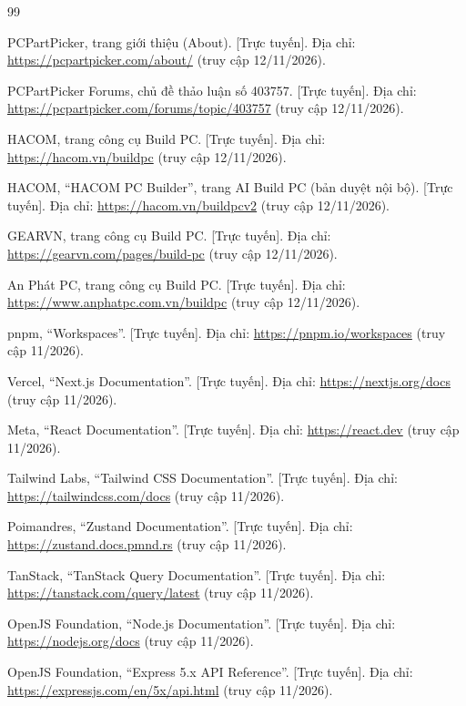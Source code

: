 \begin{thebibliography}{99}
\small

 PCPartPicker, trang giới thiệu (About). [Trực tuyến]. Địa chỉ: \url{https://pcpartpicker.com/about/} (truy cập 12/11/2026).

 PCPartPicker Forums, chủ đề thảo luận số 403757. [Trực tuyến]. Địa chỉ: \url{https://pcpartpicker.com/forums/topic/403757} (truy cập 12/11/2026).

 HACOM, trang công cụ Build PC. [Trực tuyến]. Địa chỉ: \url{https://hacom.vn/buildpc} (truy cập 12/11/2026).

 HACOM, ``HACOM PC Builder'', trang AI Build PC (bản duyệt nội bộ). [Trực tuyến]. Địa chỉ: \url{https://hacom.vn/buildpcv2} (truy cập 12/11/2026).

 GEARVN, trang công cụ Build PC. [Trực tuyến]. Địa chỉ: \url{https://gearvn.com/pages/build-pc} (truy cập 12/11/2026).

 An Phát PC, trang công cụ Build PC. [Trực tuyến]. Địa chỉ: \url{https://www.anphatpc.com.vn/buildpc} (truy cập 12/11/2026).

 pnpm, ``Workspaces''. [Trực tuyến]. Địa chỉ: \url{https://pnpm.io/workspaces} (truy cập 11/2026).

 Vercel, ``Next.js Documentation''. [Trực tuyến]. Địa chỉ: \url{https://nextjs.org/docs} (truy cập 11/2026).

 Meta, ``React Documentation''. [Trực tuyến]. Địa chỉ: \url{https://react.dev} (truy cập 11/2026).

 Tailwind Labs, ``Tailwind CSS Documentation''. [Trực tuyến]. Địa chỉ: \url{https://tailwindcss.com/docs} (truy cập 11/2026).

 Poimandres, ``Zustand Documentation''. [Trực tuyến]. Địa chỉ: \url{https://zustand.docs.pmnd.rs} (truy cập 11/2026).

 TanStack, ``TanStack Query Documentation''. [Trực tuyến]. Địa chỉ: \url{https://tanstack.com/query/latest} (truy cập 11/2026).

 OpenJS Foundation, ``Node.js Documentation''. [Trực tuyến]. Địa chỉ: \url{https://nodejs.org/docs} (truy cập 11/2026).

 OpenJS Foundation, ``Express 5.x API Reference''. [Trực tuyến]. Địa chỉ: \url{https://expressjs.com/en/5x/api.html} (truy cập 11/2026).


\end{thebibliography}
